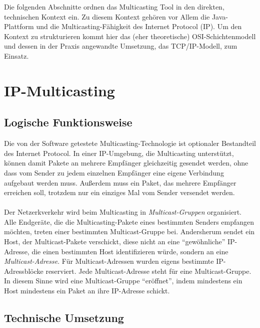 \label{sec:3:fach}
Die folgenden Abschnitte ordnen das Multicasting Tool in den direkten,
technischen Kontext ein. Zu diesem Kontext gehören vor Allem die Java-Plattform
und die Multicasting-Fähigkeit des Internet Protocol (IP). Um den Kontext zu
strukturieren kommt hier das (eher theoretische) OSI-Schichtenmodell und dessen
in der Praxis angewandte Umsetzung, das TCP/IP-Modell, zum Einsatz.

\section{IP-Multicasting}

\subsection{Logische Funktionsweise}

Die von der Software getestete Multicasting-Technologie ist optionaler
Bestandteil des Internet Protocol. In einer IP-Umgebung, die Multicasting
unterstützt, können damit Pakete an mehrere Empfänger gleichzeitig gesendet
werden, ohne dass vom Sender zu jedem einzelnen Empfänger eine eigene Verbindung
aufgebaut werden muss. Außerdem muss ein Paket, das mehrere Empfänger erreichen
soll, trotzdem nur ein einziges Mal vom Sender versendet werden.\\
\\
Der Netzerkverkehr wird beim Multicasting in \emph{Multicast-Gruppen}
organisiert. Alle Endgeräte, die die Multicasting-Pakete eines bestimmten
Senders empfangen möchten, treten einer bestimmten Multicast-Gruppe bei.
Andersherum sendet ein Host, der Multicast-Pakete verschickt, diese nicht an
eine "`gewöhnliche"' IP-Adresse, die einen bestimmten Host identifizieren würde,
sondern an eine \emph{Multicast-Adresse}. Für Multicast-Adressen wurden eigens
bestimmte IP-Adressblöcke reserviert. Jede Multicast-Adresse steht für eine
Multicast-Gruppe. In diesem Sinne wird eine Multicast-Gruppe "`eröffnet"', indem
mindestens ein Host mindestens ein Paket an ihre IP-Adresse schickt.

\subsection{Technische Umsetzung}

